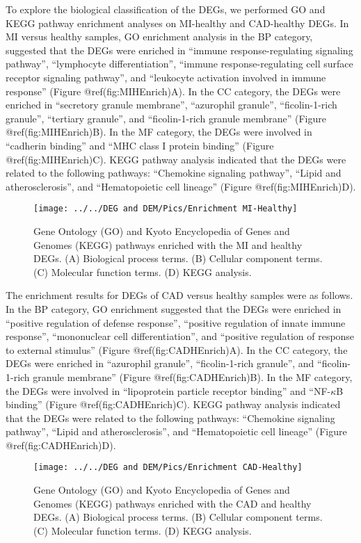 \documentclass[smallextended]{svjour3}       %
\begin{document}
To explore the biological classification of the DEGs, we performed GO
and KEGG pathway enrichment analyses on MI-healthy and CAD-healthy DEGs.
In MI versus healthy samples, GO enrichment analysis in the BP category,
suggested that the DEGs were enriched in ``immune response-regulating
signaling pathway'', ``lymphocyte differentiation'', ``immune
response-regulating cell surface receptor signaling pathway'', and
``leukocyte activation involved in immune response'' (Figure
@ref(fig:MIHEnrich)A). In the CC category, the DEGs were enriched in
``secretory granule membrane'', ``azurophil granule'', ``ficolin-1-rich
granule'', ``tertiary granule'', and ``ficolin-1-rich granule membrane''
(Figure @ref(fig:MIHEnrich)B). In the MF category, the DEGs were
involved in ``cadherin binding'' and ``MHC class I protein binding''
(Figure @ref(fig:MIHEnrich)C). KEGG pathway analysis indicated that the
DEGs were related to the following pathways: ``Chemokine signaling
pathway'', ``Lipid and atherosclerosis'', and ``Hematopoietic cell
lineage'' (Figure @ref(fig:MIHEnrich)D).

\begin{figure}
\texttt{[image: ../../DEG and DEM/Pics/Enrichment MI-Healthy]} \caption{Gene Ontology (GO) and Kyoto Encyclopedia of Genes and Genomes (KEGG) pathways enriched with the MI and healthy DEGs. (A) Biological process terms. (B) Cellular component terms. (C) Molecular function terms. (D) KEGG analysis.}\label{fig:MIHEnrich}
\end{figure}

The enrichment results for DEGs of CAD versus healthy samples were as
follows. In the BP category, GO enrichment suggested that the DEGs were
enriched in ``positive regulation of defense response'', ``positive
regulation of innate immune response'', ``mononuclear cell
differentiation'', and ``positive regulation of response to external
stimulus'' (Figure @ref(fig:CADHEnrich)A). In the CC category, the DEGs
were enriched in ``azurophil granule'', ``ficolin-1-rich granule'', and
``ficolin-1-rich granule membrane'' (Figure @ref(fig:CADHEnrich)B). In
the MF category, the DEGs were involved in ``lipoprotein particle
receptor binding'' and ``NF-\(\kappa\)B binding'' (Figure
@ref(fig:CADHEnrich)C). KEGG pathway analysis indicated that the DEGs
were related to the following pathways: ``Chemokine signaling pathway'',
``Lipid and atherosclerosis'', and ``Hematopoietic cell lineage''
(Figure @ref(fig:CADHEnrich)D).

\begin{figure}
\texttt{[image: ../../DEG and DEM/Pics/Enrichment CAD-Healthy]} \caption{Gene Ontology (GO) and Kyoto Encyclopedia of Genes and Genomes (KEGG) pathways enriched with the CAD and healthy DEGs. (A) Biological process terms. (B) Cellular component terms. (C) Molecular function terms. (D) KEGG analysis.}\label{fig:CADHEnrich}
\end{figure}
\end{document}
